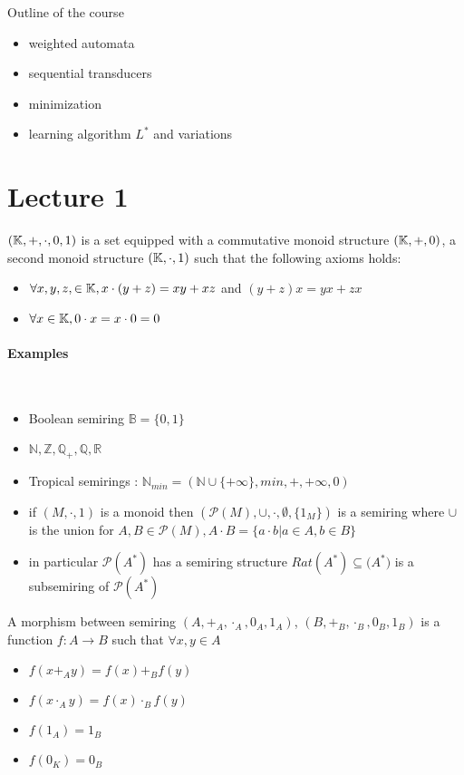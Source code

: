 Outline of the course
\begin{itemize}
	\item weighted automata
	\item sequential transducers
	\item minimization
	\item learning algorithm $L^*$ and variations
\end{itemize}

\section{Lecture 1}

\begin{definition}[Semiring] 
	$(\mathbb{K}, +, \cdot, 0, 1)$ is a set \KK
	equipped with a commutative monoid structure $(\mathbb{K}, +, 0)$, 
	a second monoid structure $(\mathbb{K}, \cdot, 1)$ such that the following
	axioms holds:
	\begin{itemize}
		\item $\forall x, y, z, \in \mathbb{K}, x\cdot( y + z) = xy + xz$ and
			$ (y+z)x = yx + zx$
		\item $\forall x \in \mathbb{K}, 0 \cdot x = x \cdot 0 = 0$
	\end{itemize}
\end{definition}
\paragraph{Examples}~
\begin{itemize}
	\item Boolean semiring $\mathbb{B} = \{0, 1\}$
	\item $\mathbb{N}, \mathbb{Z}, \mathbb{Q}_+, \mathbb{Q}, \mathbb{R}$
	\item Tropical semirings : $\mathbb{N}_{min} = (\mathbb{N} \cup 
		\{+\infty \}, min, +, +\infty, 0)$
	\item if $(M, \cdot, 1)$ is a monoid then $(\mathcal{P}(M), \cup, \cdot,
		\emptyset, \{1_M\})$ is a semiring where $\cup$ is the union
		for $A, B \in \mathcal{P}(M), A \cdot B = \{a \cdot b | a\in A, b\in B
		\}$
	\item in particular $\mathcal{P}(A^*)$ has a semiring structure
		$Rat(A^*) \subseteq \mathcal(A^*)$ is a subsemiring of
		$\mathcal{P}(A^*)$
\end{itemize}

\begin{definition} A morphism between
	semiring $(A, +_A, \cdot_A, 0_A, 1_A)$, $(B, +_B, \cdot_B, 0_B, 1_B)$
	is a function $f : A \to B$ such that $\forall x, y \in A$
	\begin{itemize}
		\item $f(x +_A y) = f(x) +_B f(y)$
		\item $f(x \cdot_A y) = f(x) \cdot_B f(y)$
		\item $f(1_A) = 1_B$
		\item $f(0_K) = 0_B$
	\end{itemize}
\end{definition}

